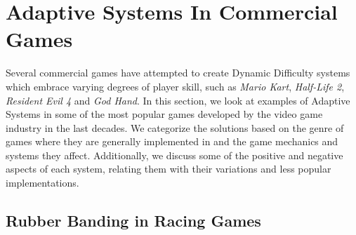 \section{Adaptive Systems In Commercial Games}

Several commercial games have attempted to create Dynamic Difficulty systems which embrace varying degrees of player skill, such as \emph{Mario Kart}, \emph{Half-Life 2}, \emph{Resident Evil 4} and \emph{God Hand}. In this section, we look at examples of Adaptive Systems in some of the most popular games developed by the video game industry in the last decades. We categorize the solutions based on the genre of games where they are generally implemented in and the game mechanics and systems they affect. Additionally, we discuss some of the positive and negative aspects of each system, relating them with their variations and less popular implementations.

\subsection{Rubber Banding in Racing Games}
\label{sec:rubber-banding-mario-kart}




